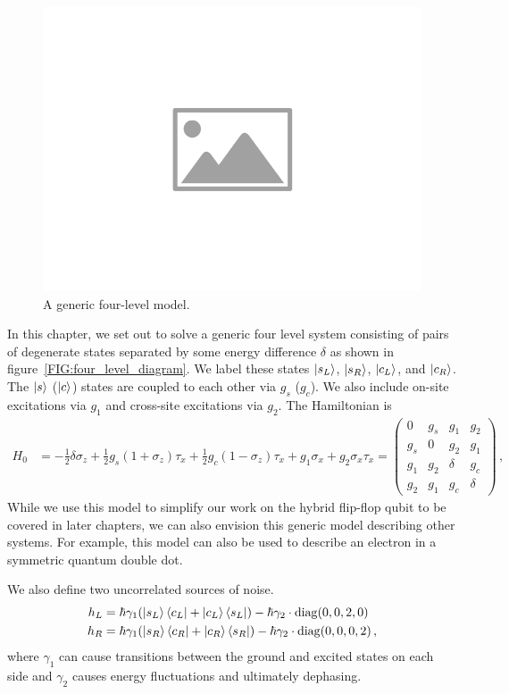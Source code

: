 \begin{figure}[htbp]
    \centering
    \includegraphics[width=0.75\columnwidth]{placeholder-image}
    \caption[Energy level diagram of a generic four level system.]{A generic four-level model. }
    \label{FIG:four_level_prefactors}
\end{figure}

In this chapter, we set out to solve a generic four level system consisting of pairs of degenerate states separated by some energy difference $\delta$ as shown in figure~\ref{FIG:four_level_diagram}. We label these states $\ket{s_L}$, $\ket{s_R}$, $\ket{c_L}$, and $\ket{c_R}$. The $\ket{s}$ ($\ket{c}$) states are coupled to each other via $g_{s}$ ($g_{c}$). We also include on-site excitations via $g_1$ and cross-site excitations via $g_2$.
The Hamiltonian is
\begin{align}
    H_0 & =-\frac{1}{2}\delta \sigma_z + \frac{1}{2}g_s(1+\sigma_z)\tau_x + \frac{1}{2}g_c(1-\sigma_z)\tau_x + g_1\sigma_x + g_2\sigma_x\tau_x =\left( \begin{array}{cccc}
            0     & g_s   & g_{1}  & g_{2}  \\
            g_s   & 0     & g_{2}  & g_{1}  \\
            g_{1} & g_{2} & \delta & g_c    \\
            g_{2} & g_{1} & g_c    & \delta
        \end{array}\right)\, ,
\end{align}
While we use this model to simplify our work on the hybrid flip-flop qubit to be covered in later chapters, we can also envision this generic model describing other systems. For example, this model can also be used to describe an electron in a symmetric quantum double dot.

We also define two uncorrelated sources of noise.
\begin{subequations}
    \begin{align}
        h_L & = \hbar\gamma_1 (\ket{s_L}\bra{c_L} +\ket{c_L}\bra{s_L})-\hbar\gamma_2 \cdot \mathrm{diag} (0,0,2,0)      \\
        h_R & = \hbar\gamma_1 (\ket{s_R}\bra{c_R} +\ket{c_R}\bra{s_R})-\hbar\gamma_2 \cdot \mathrm{diag} (0,0,0,2) \, ,
    \end{align}
\end{subequations}
where $\gamma_1$ can cause transitions between the ground and excited states on each side and $\gamma_2$ causes energy fluctuations and ultimately dephasing.

